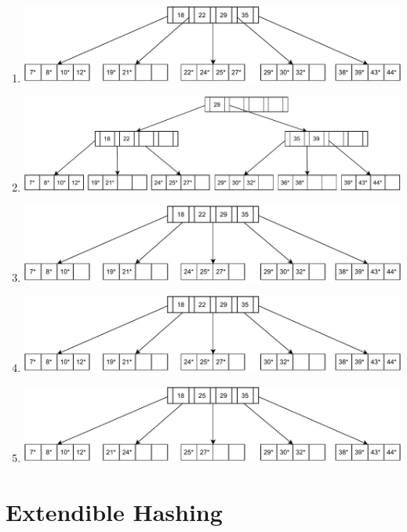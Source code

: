 \documentclass{article}
\begin{document}
\begin{enumerate}
    \item \includegraphics[width=\linewidth]{img/4-3-a.pdf}
    \item \includegraphics[width=\linewidth]{img/4-3-b.pdf}
    \item \includegraphics[width=\linewidth]{img/4-3-c.pdf}
    \item \includegraphics[width=\linewidth]{img/4-3-d.pdf}
    \item \includegraphics[width=\linewidth]{img/4-3-e.pdf}
\end{enumerate}

\newpage

\section{Extendible Hashing}
\end{document}
